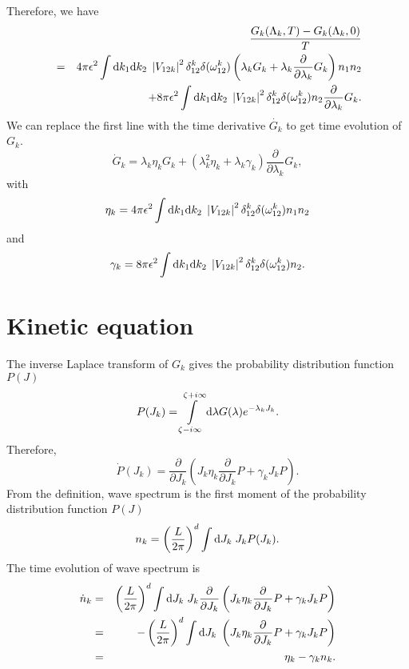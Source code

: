 Therefore, we have
\begin{eqnarray}
	&& \frac{G_k(\Lambda_k,T)-G_k(\Lambda_k,0)}{T} \nonumber\\
	&=& 4\pi\epsilon^2  \int\mathrm{d} k_1\mathrm{d} k_2\;\left|{ V_{12k}}\right |^2 \delta_{12}^k\delta(\omega_{12}^{k}) \left( \lambda_k G_k+\lambda_k \frac{\partial}{\partial \lambda_k}G_k\right) n_1 n_2\nonumber\\
	&&+ 8\pi\epsilon^2\int\mathrm{d} k_1\mathrm{d} k_2\;\left|{ V_{12k}}\right |^2 \delta_{12}^k \delta(\omega_{12}^{k}) n_2\frac{\partial}{\partial \lambda_k}G_k.
\end{eqnarray}
We can replace the first line with the time derivative $\dot{G_k}$ to get time evolution of $G_k$.
\begin{equation}
	\dot{G}_k = \lambda_k \eta_k G_k+(\lambda_k^2 \eta_k + \lambda_k\gamma_k)\frac{\partial}{\partial \lambda_k}G_k,
\end{equation}
with
\begin{equation}
	\eta_k = 4\pi\epsilon^2  \int\mathrm{d} k_1\mathrm{d} k_2\;\left|{ V_{12k}}\right |^2 \delta_{12}^k\delta(\omega_{12}^{k}) n_1 n_2
\end{equation}
and 
\begin{equation}
	\gamma_k = 8\pi\epsilon^2\int\mathrm{d} k_1\mathrm{d} k_2\;\left|{ V_{12k}}\right |^2 \delta_{12}^k \delta(\omega_{12}^{k})n_2.
\end{equation}

\section{Kinetic equation}

The inverse Laplace transform of $G_k$ gives the probability distribution function $P(J)$
\begin{equation}
	P(J_k) = \int\limits_{\zeta-i\infty}^{\zeta+i\infty}\mathrm{d} \lambda G(\lambda)e^{-\lambda_k J_k}.
\end{equation}
Therefore,
\begin{equation}
	\dot{P}(J_k) =\frac{\partial}{\partial J_k}\left( J_k \eta_k\frac{\partial}{\partial J_k}P + \gamma_k J_k P \right).
\end{equation}
From the definition, wave spectrum is the first moment of the probability distribution function $P(J)$
\begin{equation}
	n_k = \left(\frac{L}{2\pi} \right)^d\int \mathrm{d} J_k \; J_k P(J_k).
\end{equation}
The time evolution of wave spectrum is
\begin{eqnarray}\label{kinetic}
	\dot{n}_k & = & \left(\frac{L}{2\pi}\right)^d\int \mathrm{d} J_k \; J_k \frac{\partial}{\partial J_k} \left( J_k \eta_k\frac{\partial}{\partial J_k}P + \gamma_k J_k P \right)\nonumber\\
	&=& - \left(\frac{L}{2\pi} \right)^d\int \mathrm{d} J_k\; \left( J_k \eta_k\frac{\partial}{\partial J_k}P + \gamma_k J_k P \right)\nonumber\\
	&=&\eta_k-\gamma_k n_k.
\end{eqnarray}

